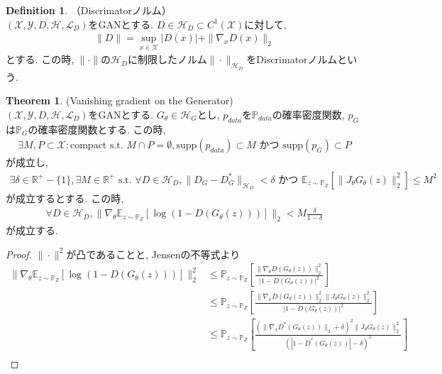 \documentclass[11pt, a4paper, dvipdfmx]{jsarticle}
\theoremstyle{definition}
\newtheorem{Definition+}[Axiom+]{Definition}
\newtheorem{Theorem+}[Axiom+]{Theorem}
\newcommand{\R}{\mathbb{R}}
\newcommand{\X}{\mathcal{X}}
\newcommand{\Y}{\mathcal{Y}}
\newcommand{\Hil}{\mathcal{H}}
\newcommand{\Loss}{\mathcal{L}_{D}}
\newcommand{\MLsp}{(\X, \Y, D, \Hil, \Loss)}
\begin{document}
\begin{Definition+}（Discrimatorノルム）\\
    $\MLsp$をGANとする. $D\in\Hil_{D}\subset C^{1}(\X)$に対して, 
    \begin{align*}
        \|D\| = \sup_{x\in\X}|D(x)| + \|\nabla_{x}D(x)\|_{2}
    \end{align*}
    とする. この時, $\|\cdot\|$の$\Hil_{D}$に制限したノルム$\|\cdot\|_{\Hil_{D}}$をDiscrimatorノルムという.
\end{Definition+}
\begin{Theorem+}(Vanishing gradient on the Generator)\\
    $\MLsp$をGANとする. $G_{\theta}\in\Hil_{G}$とし, $p_{data}$を$\mathbb{P}_{data}$の確率密度関数, $p_{G}$は$\mathbb{P}_{G}$の確率密度関数とする. この時, 
    \begin{align*}
        \exists M, P\subset\X:\text{compact s.t. }M\cap P = \emptyset, \text{supp}(p_{data})\subset M\text{ かつ }\text{supp}(p_{G})\subset P
    \end{align*}
    が成立し, 
    \begin{align*}
        \exists\delta\in\R^{+}-\{1\}, \exists M\in\R^{+}\text{ s.t. }\forall D\in\Hil_{D}, \|D_{G} - D_{G}^{*}\|_{\Hil_{D}} <\delta\text{ かつ }\mathbb{E}_{z\sim\mathbb{P}_{Z}}[\|J_{\theta}G_{\theta}(z)\|_{2}^{2}] \leq M^{2}
    \end{align*}
    が成立するとする. この時, 
    \begin{align*}
        \forall D\in\Hil_{D}, \|\nabla_{\theta}\mathbb{E}_{z\sim\mathbb{P}_{Z}}[\log(1 - D(G_{\theta}(z)))]\|_{2} < M\frac{\delta}{1 - \delta}
    \end{align*}
    が成立する.
    \begin{proof}
        $\|\cdot\|^{2}$が凸であることと, Jensenの不等式より
        \begin{align*}
            \|\nabla_{\theta}\mathbb{E}_{z\sim\mathbb{P}_{Z}}[\log(1 - D(G_{\theta}(z)))]\|_{2}^{2} &\leq\mathbb{P}_{z\sim\mathbb{P}_{Z}}\left[ \frac{\|\nabla_{\theta}D(G_{\theta}(z))\|_{2}^{2}}{|1 - D(G_{\theta}(z))|^{2}} \right]\\
                                                                                                    &\leq\mathbb{P}_{z\sim\mathbb{P}_{Z}}\left[ \frac{\|\nabla_{x}D(G_{\theta}(z))\|_{2}^{2}\|J_{\theta}G_{\theta}(z)\|_{2}^{2}}{|1 - D(G_{\theta}(z))|^{2}} \right]\\
                                                                                                    &\leq\mathbb{P}_{z\sim\mathbb{P}_{Z}}\left[ \frac{(\|\nabla_{x}D^{*}(G_{\theta}(z))\|_{2} + \delta)^{2}\|J_{\theta}G_{\theta}(z)\|_{2}^{2}}{(|1 - D^{*}(G_{\theta}(z))| - \delta)^{2}} \right]\\

\end{align*}
\end{proof}
\end{Theorem+}
\end{document}
